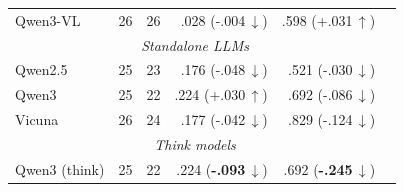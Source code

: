 \begin{table}[t]
{\begin{tabular}{lrrrrr}
Qwen3-VL & 26 & 26 & .028 (\textcolor[HTML]{0072B2}{-.004\,$\downarrow$}) & .598 (\textcolor[HTML]{CC7A00}{+.031\,$\uparrow$}) \\
\multicolumn{5}{c}{\textit{Standalone LLMs}} \\
\midrule
Qwen2.5 & 25 & 23 & .176 (\textcolor[HTML]{0072B2}{-.048\,$\downarrow$}) & .521 (\textcolor[HTML]{0072B2}{-.030\,$\downarrow$}) \\
Qwen3 & 25 & 22 & .224 (\textcolor[HTML]{CC7A00}{+.030\,$\uparrow$}) & .692 (\textcolor[HTML]{0072B2}{-.086\,$\downarrow$}) \\
Vicuna & 26 & 24 & .177 (\textcolor[HTML]{0072B2}{-.042\,$\downarrow$}) & .829 (\textcolor[HTML]{0072B2}{-.124\,$\downarrow$}) \\
\multicolumn{5}{c}{\textit{Think models}} \\
\midrule
Qwen3 (think) & 25 & 22 & .224 (\textcolor[HTML]{0072B2}{\textbf{-.093}\,$\downarrow$}) & .692 (\textcolor[HTML]{0072B2}{\textbf{-.245}\,$\downarrow$}) \\
\bottomrule
\end{tabular}%
}
\end{table}
